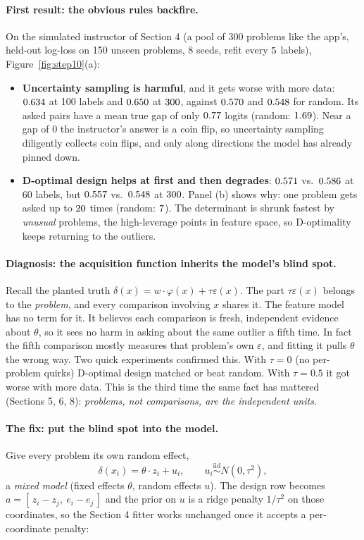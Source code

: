 \documentclass[11pt]{article}
\theoremstyle{definition}
\theoremstyle{plain}
\theoremstyle{remark}
\renewcommand{\_}{\oldunderscore\allowbreak}
\begin{document}
\paragraph{First result: the obvious rules backfire.}
On the simulated instructor of Section 4 (a pool of 300 problems like the app's, held-out log-loss on 150 unseen problems, 8 seeds, refit every $5$ labels),
Figure~\ref{fig:step10}(a):
\begin{itemize}[nosep]
\item \textbf{Uncertainty sampling is harmful}, and it gets worse with more data: $0.634$ at 100 labels and $0.650$ at $300$, against
  $0.570$ and $0.548$ for random. Its asked pairs have a mean true gap of only $0.77$ logits (random: $1.69$). Near a gap of 0 the instructor's answer
  is a coin flip, so uncertainty sampling diligently collects coin flips, and only along directions the model has already pinned down.
\item \textbf{D-optimal design helps at first and then degrades}: $0.571$ vs.\ $0.586$ at 60 labels, but $0.557$ vs.\ $0.548$ at $300$.
  Panel (b) shows why: one problem gets asked up to $20$ times (random: $7$). The determinant is shrunk fastest by \emph{unusual} problems, the high-leverage
  points in feature space, so D-optimality keeps returning to the outliers.
\end{itemize}

\paragraph{Diagnosis: the acquisition function inherits the model's blind spot.}
Recall the planted truth $\delta(x)=w\cdot\varphi(x)+\tau\varepsilon(x)$. The part $\tau\varepsilon(x)$ belongs to the \emph{problem}, and every comparison involving $x$ shares it.
The feature model has no term for it. It believes each comparison is fresh, independent evidence about $\theta$, so it sees no harm in asking about the same
outlier a fifth time. In fact the fifth comparison mostly measures that problem's own $\varepsilon$, and fitting it pulls $\theta$ the wrong way. Two
quick experiments confirmed this. With $\tau=0$ (no per-problem quirks) D-optimal design matched or beat random. With $\tau=0.5$ it
got worse with more data. This is the third time the same fact has mattered (Sections 5, 6, 8): \emph{problems, not comparisons, are the independent units}.

\paragraph{The fix: put the blind spot into the model.}
Give every problem its own random effect,
\[
  \delta(x_i)=\theta\cdot z_i+u_i,\qquad u_i\overset{\text{iid}}\sim N(0,\tau^2),
\]
a \emph{mixed model} (fixed effects $\theta$, random effects $u$). The design row becomes $a=[\,z_i-z_j,\ e_i-e_j\,]$ and the prior on $u$ is a ridge penalty
$1/\tau^2$ on those coordinates, so the Section 4 fitter works unchanged once it accepts a per-coordinate penalty:
\end{document}
